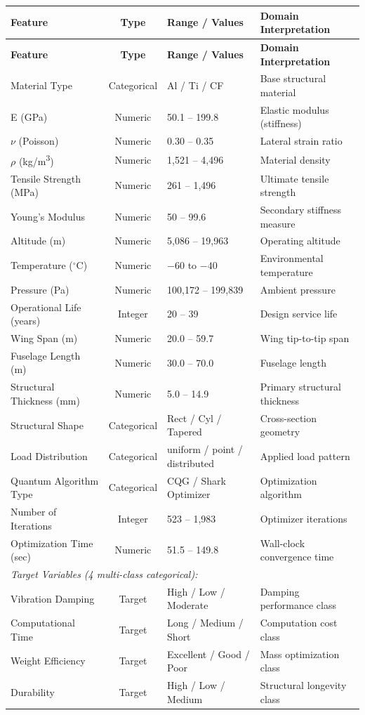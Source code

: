 \documentclass[11pt, a4paper]{report}
\begin{document}
\begin{longtable}{p{4.5cm} c p{3.5cm} p{4.5cm}}
\toprule
\textbf{Feature} & \textbf{Type} & \textbf{Range / Values} & \textbf{Domain Interpretation} \\
\midrule
\endfirsthead
\toprule
\textbf{Feature} & \textbf{Type} & \textbf{Range / Values} & \textbf{Domain Interpretation} \\
\midrule
\endhead
Material Type & Categorical & Al / Ti / CF & Base structural material \\
E (GPa) & Numeric & 50.1 -- 199.8 & Elastic modulus (stiffness) \\
$\nu$ (Poisson) & Numeric & 0.30 -- 0.35 & Lateral strain ratio \\
$\rho$ (kg/m\textsuperscript{3}) & Numeric & 1{,}521 -- 4{,}496 & Material density \\
Tensile Strength (MPa) & Numeric & 261 -- 1{,}496 & Ultimate tensile strength \\
Young's Modulus & Numeric & 50 -- 99.6 & Secondary stiffness measure \\
Altitude (m) & Numeric & 5{,}086 -- 19{,}963 & Operating altitude \\
Temperature ($^{\circ}$C) & Numeric & $-60$ to $-40$ & Environmental temperature \\
Pressure (Pa) & Numeric & 100{,}172 -- 199{,}839 & Ambient pressure \\
Operational Life (years) & Integer & 20 -- 39 & Design service life \\
Wing Span (m) & Numeric & 20.0 -- 59.7 & Wing tip-to-tip span \\
Fuselage Length (m) & Numeric & 30.0 -- 70.0 & Fuselage length \\
Structural Thickness (mm) & Numeric & 5.0 -- 14.9 & Primary structural thickness \\
Structural Shape & Categorical & Rect / Cyl / Tapered & Cross-section geometry \\
Load Distribution & Categorical & uniform / point / distributed & Applied load pattern \\
Quantum Algorithm Type & Categorical & CQG / Shark Optimizer & Optimization algorithm \\
Number of Iterations & Integer & 523 -- 1{,}983 & Optimizer iterations \\
Optimization Time (sec) & Numeric & 51.5 -- 149.8 & Wall-clock convergence time \\
\midrule
\multicolumn{4}{l}{\textit{Target Variables (4 multi-class categorical):}} \\
\midrule
Vibration Damping & Target & High / Low / Moderate & Damping performance class \\
Computational Time & Target & Long / Medium / Short & Computation cost class \\
Weight Efficiency & Target & Excellent / Good / Poor & Mass optimization class \\
Durability & Target & High / Low / Medium & Structural longevity class \\
\bottomrule
\end{longtable}
\end{document}
